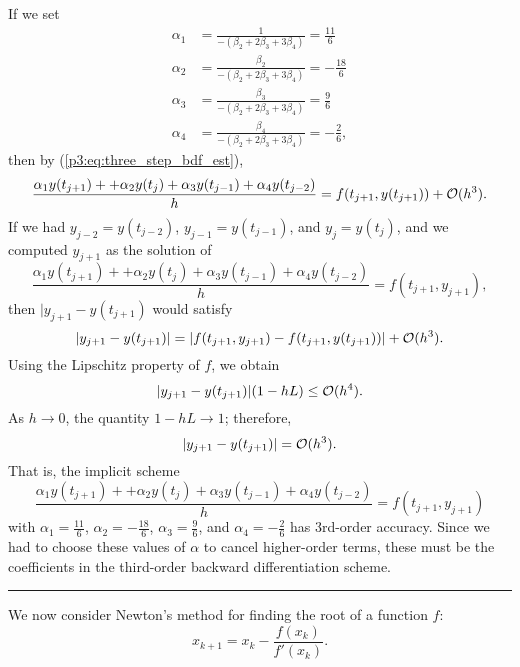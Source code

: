 \documentclass{homework}
\begin{document}
	If we set 
	\begin{align}
		\alpha_1 &= \frac{1}{-(\beta_2 + 2\beta_3 + 3\beta_4)} = \frac{11}{6} \\
		\alpha_2 &= \frac{\beta_2}{-(\beta_2 + 2\beta_3 + 3\beta_4)} = -\frac{18}{6}\\
		\alpha_3 &= \frac{\beta_3}{-(\beta_2 + 2\beta_3 + 3\beta_4)} = \frac{9}{6}\\
		\alpha_4 &= \frac{\beta_4}{-(\beta_2 + 2\beta_3 + 3\beta_4)} = -\frac{2}{6},
	\end{align}
	then by (\ref{p3:eq:three_step_bdf_est}),
	\begin{equation}
		\frac{\alpha_1y(t_{j+1}) + +\alpha_2y(t_j) +\alpha_3y(t_{j-1}) + \alpha_4y(t_{j-2})}{h} = f(t_{j+1},y(t_{j+1})) + \mathcal{O}(h^3).
	\end{equation}
	If we had $y_{j-2} = y(t_{j-2})$, $y_{j-1} = y(t_{j-1})$, and $y_j = y(t_j)$, and we computed $y_{j+1}$ as the solution of
	\begin{equation}
		\frac{\alpha_1y(t_{j+1}) + +\alpha_2y(t_j) +\alpha_3y(t_{j-1}) + \alpha_4y(t_{j-2})}{h} = f(t_{j+1}, y_{j+1}),
	\end{equation}
	then $|y_{j+1} - y(t_{j+1})$ would satisfy
	\begin{equation}
		|y_{j+1} - y(t_{j+1})| = |f(t_{j+1}, y_{j+1}) - f(t_{j+1}, y(t_{j+1}))| + \mathcal{O}(h^3).
	\end{equation}
	Using the Lipschitz property of $f$, we obtain
	\begin{equation}
		|y_{j+1} - y(t_{j+1})|(1-hL) \le \mathcal{O}(h^4).
	\end{equation}
	As $h\to 0$, the quantity $1-hL \to 1$; therefore,
	\begin{equation}
		|y_{j+1} - y(t_{j+1})| = \mathcal{O}(h^3).
	\end{equation}
	That is, the implicit scheme
	\begin{equation}
		\label{p3:eq:3_step_bdf_scheme}
		\frac{\alpha_1y(t_{j+1}) + +\alpha_2y(t_j) +\alpha_3y(t_{j-1}) + \alpha_4y(t_{j-2})}{h} = f(t_{j+1}, y_{j+1})
	\end{equation}
	with $\alpha_1 = \frac{11}{6}$, $\alpha_2 = -\frac{18}{6}$, $\alpha_3 = \frac{9}{6}$, and $\alpha_4 = -\frac{2}{6}$ has 3rd-order accuracy. Since we had to choose these values of $\alpha$ to cancel higher-order terms, these must be the coefficients in the third-order backward differentiation scheme.
	\\
	\hrule
	
	We now consider Newton's method for finding the root of a function $f$:
	\begin{equation}
		x_{k+1} = x_k - \frac{f(x_k)}{f'(x_k)}.
	\end{equation}
	
\end{document}
